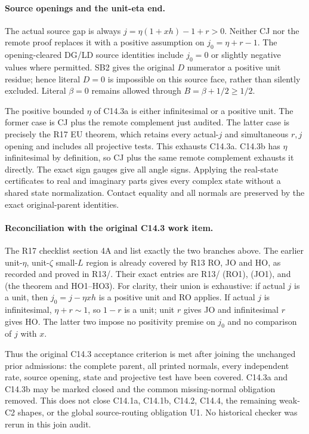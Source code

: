 \paragraph{Source openings and the unit-eta end.}
The actual source gap is always
$j=\eta(1+xh)-1+r>0$.  Neither CJ nor the remote proof replaces it
with a positive assumption on $j_0=\eta+r-1$.  The opening-cleared
DG/LD source identities include $j_0=0$ or slightly negative values
where permitted.  SB2 gives the original $D$ numerator a positive
unit residue; hence literal $D=0$ is impossible on this source face,
rather than silently excluded.  Literal $\beta=0$ remains allowed
through $B=\beta+1/2\ge1/2$.

The positive bounded $\eta$ of C14.3a is either infinitesimal or a
positive unit.  The former case is CJ plus the remote complement
just audited.  The latter case is precisely the R17 EU theorem,
which retains every actual-$j$ and simultaneous $r,j$ opening and
includes all projective tests.  This exhausts C14.3a.  C14.3b has
$\eta$ infinitesimal by definition, so CJ plus the same remote
complement exhausts it directly.  The exact sign gauges give all
angle signs.  Applying the real-state certificates to real and
imaginary parts gives every complex state without a shared state
normalization.  Contact equality and all normals are preserved by
the exact original-parent identities.

\paragraph{Reconciliation with the original C14.3 work item.}
The R17 checklist section 4A and  list exactly
the two branches above.  The earlier unit-$\eta$, unit-$\zeta$
small-$L$ region is already covered by R13 RO, JO and HO, as recorded
and proved in R13/.  Their exact
entries are R13/
 (RO1),
 (JO1), and
 (the theorem and HO1--HO3).
For clarity, their union is exhaustive: if actual $j$ is a unit,
then $j_0=j-\eta xh$ is a positive unit and RO applies.  If actual
$j$ is infinitesimal, $\eta+r\sim1$, so $1-r$ is a unit; unit $r$
gives JO and infinitesimal $r$ gives HO.  The latter two impose no
positivity premise on $j_0$ and no comparison of $j$ with $x$.

Thus the original C14.3 acceptance criterion is met after joining
the unchanged prior admissions: the complete parent, all printed
normals, every independent rate, source opening, state and projective
test have been covered.  C14.3a and C14.3b may be marked closed and
the common missing-normal obligation removed.  This does not close
C14.1a, C14.1b, C14.2, C14.4, the remaining weak-C2 shapes, or the
global source-routing obligation U1.  No historical checker was
rerun in this join audit.
